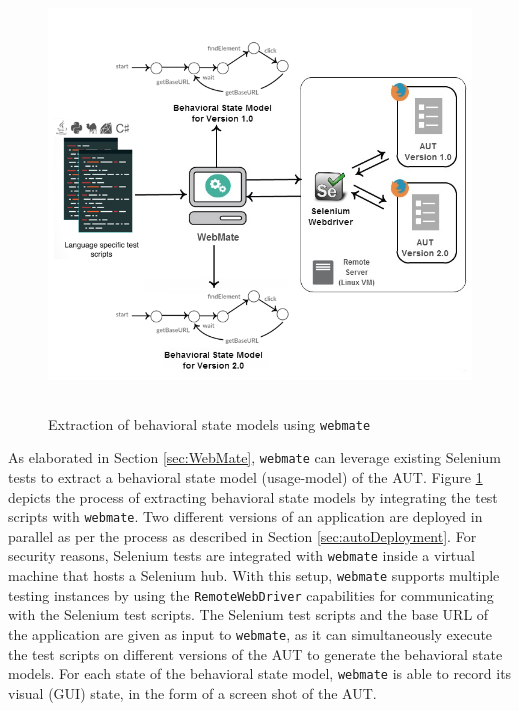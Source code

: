 \begin{figure}[h]
\makeatletter 
\makeatother
    \centering
  \includegraphics[width=5.5in,height=4.5in]{./Figures/WebMate_state_extraction.png}

\caption{Extraction of behavioral state models using \texttt{webmate}}
 \label{fig:webmateExtraction} 
\end{figure}

As elaborated in Section \ref{sec:WebMate}, \texttt{webmate} can leverage existing Selenium tests to extract a behavioral state model (usage-model) of the AUT. Figure \ref{fig:webmateExtraction} depicts the process of extracting behavioral state models by integrating the test scripts with \texttt{webmate}. Two different versions of an application are deployed in parallel as per the process as described in Section \ref{sec:autoDeployment}. For security reasons, Selenium tests are integrated with \texttt{webmate} inside a virtual machine that hosts a Selenium hub. With this setup, \texttt{webmate} supports multiple testing instances by using the \texttt{RemoteWebDriver} capabilities for communicating with the Selenium test scripts. The Selenium test scripts and the base URL of the application are given as input to \texttt{webmate}, as it can simultaneously execute the test scripts on different versions of the AUT to generate the behavioral state models. For each state of the behavioral state model, \texttt{webmate} is able to record its visual (GUI) state, in the form of a screen shot of the AUT. 

